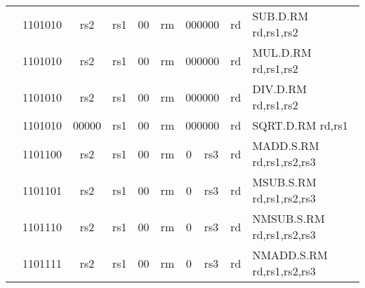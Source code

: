 \begin{table}[p]
\begin{small}
\begin{center}
\begin{tabular}{rcccccccccccl}
&
\multicolumn{2}{|c|}{1101010} &
\multicolumn{1}{c|}{rs2} &
\multicolumn{1}{c|}{rs1} &
\multicolumn{1}{c|}{00} &
\multicolumn{2}{c|}{rm} &
\multicolumn{3}{c|}{000000} &
\multicolumn{1}{c|}{rd} & SUB.D.RM rd,rs1,rs2 \\
\cline{2-12}
  

&
\multicolumn{2}{|c|}{1101010} &
\multicolumn{1}{c|}{rs2} &
\multicolumn{1}{c|}{rs1} &
\multicolumn{1}{c|}{00} &
\multicolumn{2}{c|}{rm} &
\multicolumn{3}{c|}{000000} &
\multicolumn{1}{c|}{rd} & MUL.D.RM rd,rs1,rs2 \\
\cline{2-12}
  

&
\multicolumn{2}{|c|}{1101010} &
\multicolumn{1}{c|}{rs2} &
\multicolumn{1}{c|}{rs1} &
\multicolumn{1}{c|}{00} &
\multicolumn{2}{c|}{rm} &
\multicolumn{3}{c|}{000000} &
\multicolumn{1}{c|}{rd} & DIV.D.RM rd,rs1,rs2 \\
\cline{2-12}
  

&
\multicolumn{2}{|c|}{1101010} &
\multicolumn{1}{c|}{00000} &
\multicolumn{1}{c|}{rs1} &
\multicolumn{1}{c|}{00} &
\multicolumn{2}{c|}{rm} &
\multicolumn{3}{c|}{000000} &
\multicolumn{1}{c|}{rd} & SQRT.D.RM rd,rs1 \\
\cline{2-12}
  

&
\multicolumn{2}{|c|}{1101100} &
\multicolumn{1}{c|}{rs2} &
\multicolumn{1}{c|}{rs1} &
\multicolumn{1}{c|}{00} &
\multicolumn{2}{c|}{rm} &
\multicolumn{1}{c|}{0} &
\multicolumn{2}{c|}{rs3} &
\multicolumn{1}{c|}{rd} & MADD.S.RM rd,rs1,rs2,rs3 \\
\cline{2-12}
  

&
\multicolumn{2}{|c|}{1101101} &
\multicolumn{1}{c|}{rs2} &
\multicolumn{1}{c|}{rs1} &
\multicolumn{1}{c|}{00} &
\multicolumn{2}{c|}{rm} &
\multicolumn{1}{c|}{0} &
\multicolumn{2}{c|}{rs3} &
\multicolumn{1}{c|}{rd} & MSUB.S.RM rd,rs1,rs2,rs3 \\
\cline{2-12}
  

&
\multicolumn{2}{|c|}{1101110} &
\multicolumn{1}{c|}{rs2} &
\multicolumn{1}{c|}{rs1} &
\multicolumn{1}{c|}{00} &
\multicolumn{2}{c|}{rm} &
\multicolumn{1}{c|}{0} &
\multicolumn{2}{c|}{rs3} &
\multicolumn{1}{c|}{rd} & NMSUB.S.RM rd,rs1,rs2,rs3 \\
\cline{2-12}
  

&
\multicolumn{2}{|c|}{1101111} &
\multicolumn{1}{c|}{rs2} &
\multicolumn{1}{c|}{rs1} &
\multicolumn{1}{c|}{00} &
\multicolumn{2}{c|}{rm} &
\multicolumn{1}{c|}{0} &
\multicolumn{2}{c|}{rs3} &
\multicolumn{1}{c|}{rd} & NMADD.S.RM rd,rs1,rs2,rs3 \\
\cline{2-12}
  


\end{tabular}
\end{center}
\end{small}
\end{table}
